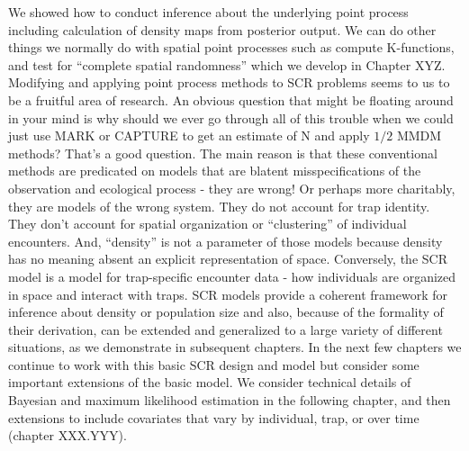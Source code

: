 We showed how to conduct inference about the underlying point process including calculation of density maps from posterior output. We can do other things we normally do with spatial point processes such as compute K-functions, and test for ``complete spatial randomness'' which we develop in Chapter XYZ.  Modifying and applying point process methods to SCR problems seems to us to be a fruitful area of research.
An obvious question that might be floating around in your mind is why should we ever go through all of this trouble when we could just use MARK or CAPTURE to get an estimate of N and apply $1/2$ MMDM methods?  That's a good question. The main reason is that these conventional methods are predicated on models that are blatent misspecifications of the observation and ecological process - they are wrong! Or perhaps more charitably, they are models of the wrong system. They do not account for trap identity. They don't account for spatial organization or ``clustering'' of individual encounters. And, ``density'' is not a parameter of those models because density has no meaning absent an explicit representation of space. Conversely, the SCR model is a model for trap-specific encounter data - how individuals are organized in space and interact with traps. SCR models provide a coherent framework for inference about density or population size and also, because of the formality of their derivation, can be extended and generalized to a large variety of different situations, as we demonstrate in subsequent chapters.
In the next few chapters we continue to work with this basic SCR
design and model but consider some important extensions of the basic
model. We consider technical details of Bayesian and  maximum
likelihood estimation in the following chapter, and then extensions to include covariates that vary by individual, trap, or over time (chapter XXX.YYY).
